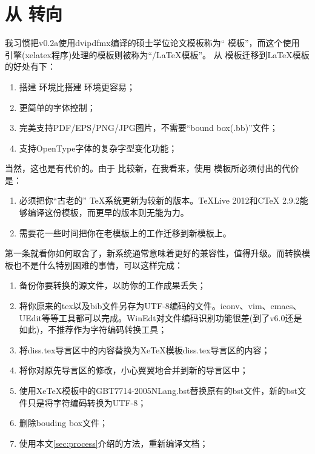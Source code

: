 \chapter{从 {\CJKLaTeX} 转向 \texorpdfstring{\XeTeX}{XeTeX}}
\label{chap:whydvipdfm}

我习惯把v0.2a使用dvipdfmx编译的硕士学位论文模板称为“ \CJKLaTeX 模板”，而这个使用 \XeTeX 引擎(xelatex程序)处理的模板则被称为“{\XeTeX/\LaTeX}模板”。
从 \CJKLaTeX 模板迁移到{\XeTeX\LaTeX}模板的好处有下：
\begin{enumerate}
\item[\large\smiley] 搭建 \XeTeX 环境比搭建 \CJKLaTeX 环境更容易；
\item[\large\smiley] 更简单的字体控制；
\item[\large\smiley] 完美支持PDF/EPS/PNG/JPG图片，不需要“bound box(.bb)”文件；
\item[\large\smiley] 支持OpenType字体的复杂字型变化功能；
\end{enumerate}

当然，这也是有代价的。由于 \XeTeX 比较新，在我看来，使用 \XeTeX 模板所必须付出的代价是：

\begin{enumerate}
\item[\large\frownie] 必须把你“古老的” \TeX 系统更新为较新的版本。TeXLive 2012和CTeX 2.9.2能够编译这份模板，而更早的版本则无能为力。
\item[\large\frownie] 需要花一些时间把你在老模板上的工作迁移到新模板上。
\end{enumerate}

第一条就看你如何取舍了，新系统通常意味着更好的兼容性，值得升级。而转换模板也不是什么特别困难的事情，可以这样完成：

\begin{enumerate}
\item 备份你要转换的源文件，以防你的工作成果丢失；
\item 将你原来的tex以及bib文件另存为UTF-8编码的文件。iconv、vim、emacs、UEdit等等工具都可以完成。WinEdt对文件编码识别功能很差(到了v6.0还是如此)，不推荐作为字符编码转换工具；
\item 将diss.tex导言区中的内容替换为XeTeX模板diss.tex导言区的内容；
\item 将你对原先导言区的修改，小心翼翼地合并到新的导言区中；
\item 使用XeTeX模板中的GBT7714-2005NLang.bst替换原有的bst文件，新的bst文件只是将字符编码转换为UTF-8；
\item 删除bouding box文件；
\item 使用本文\ref{sec:process}介绍的方法，重新编译文档；
\end{enumerate}

